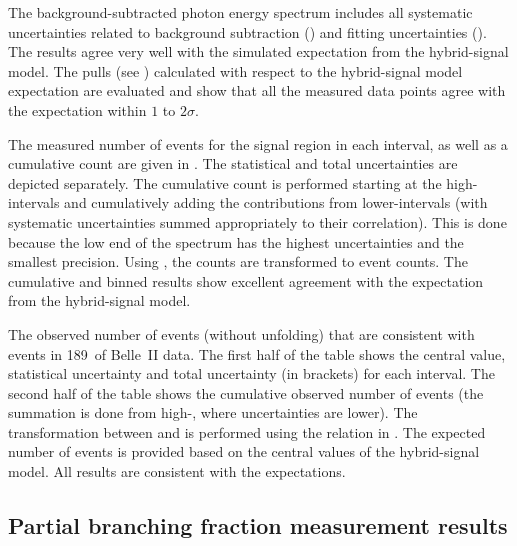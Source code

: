 The background-subtracted photon energy spectrum includes all systematic uncertainties related 
to background subtraction ()
and fitting uncertainties ().
The results agree very well with the simulated expectation from the hybrid-signal model.
The pulls (see ) calculated with respect to the hybrid-signal model expectation are evaluated 
and show that all the measured data points agree with the expectation within $1$ to $2\sigma$.

The measured number of events for the signal region in each \EB interval, as well as a cumulative count are given in .
The statistical and total uncertainties are depicted separately.
The cumulative count is performed starting at the high-\EB intervals and cumulatively adding the contributions from lower-\EB intervals (with systematic uncertainties summed appropriately to their correlation).
This is done because the low end of the \EB spectrum has the highest uncertainties and the smallest precision.
Using , the \BtoXsdgamma counts are transformed to \BtoXsgamma event counts.
The cumulative and binned results show excellent agreement with the expectation from the hybrid-signal model.

\begin{table}
    \caption{\label{tab:observed_events}
    The observed number of events (without unfolding) that are consistent with \BtoXsdgamma events in 189~\invfb of Belle~II data.
    The first half of the table shows the central value, statistical uncertainty and total uncertainty (in brackets) for each \EB interval.
    The second half of the table shows the cumulative observed number of events (the summation is done from high-\EB, where uncertainties are lower).
    The transformation between \BtoXsdgamma and \BtoXsgamma is performed using the relation in .
    The expected number of \BtoXsgamma events is provided based on the central values of the hybrid-signal model.
    All results are consistent with the expectations.
    }
    
\end{table}


\subsection{Partial branching fraction measurement results}\label{sec:partial_branching_fraction_results}

